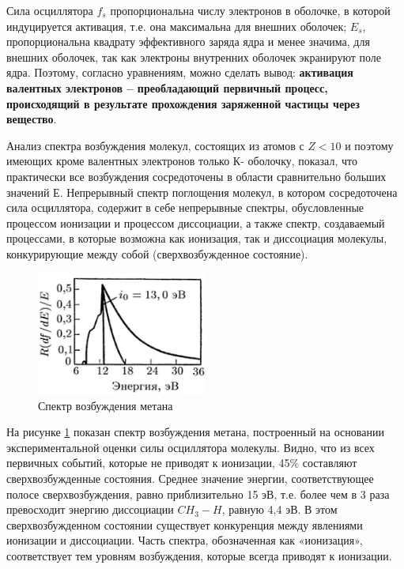\documentclass[a4paper, 14pt]{article}
\begin{document}
Сила осциллятора $f_s$ пропорциональна числу электронов в оболочке, в которой
индуцируется активация, т.е. она максимальна для внешних оболочек; $E_s$,
пропорциональна квадрату эффективного заряда ядра и менее значима, для внешних
оболочек, так как электроны внутренних оболочек экранируют поле ядра. Поэтому,
согласно уравнениям, можно сделать вывод: \textbf{активация валентных электронов – преобладающий первичный процесс, происходящий в результате прохождения
заряженной частицы через вещество}.

Анализ спектра возбуждения молекул, состоящих из атомов с $Z < 10$ и поэтому
имеющих кроме валентных электронов только К- оболочку, показал, что практически
все возбуждения сосредоточены в области сравнительно больших значений $Е$.
Непрерывный спектр поглощения молекул, в котором сосредоточена сила
осциллятора, содержит в себе непрерывные спектры, обусловленные процессом
ионизации и процессом диссоциации, а также спектр, создаваемый процессами, в
которые возможна как ионизация, так и диссоциация молекулы, конкурирующие
между собой (сверхвозбужденное состояние).

\begin{figure}
    \begin{center}
      \includegraphics[width=0.5\textwidth]{methanSpectrum.png}
    \end{center}
    \caption{Спектр возбуждения метана}
    \label{methanSpectrum}
\end{figure}

На рисунке \ref{methanSpectrum} показан спектр возбуждения метана, построенный на основании экспериментальной оценки силы осциллятора молекулы. Видно, что из всех первичных событий, которые не приводят к ионизации, 45\% составляют сверхвозбужденные состояния. Среднее значение энергии, соответствующее полосе сверхвозбуждения, равно приблизительно 15 эВ, т.е. более чем в 3 раза превосходит энергию диссоциации $CH_3-H$, равную 4,4 эВ. В этом сверхвозбужденном состоянии существует конкуренция между явлениями ионизации и диссоциации. Часть спектра, обозначенная как «ионизация», соответствует тем уровням возбуждения, которые всегда приводят к ионизации.
\end{document}
